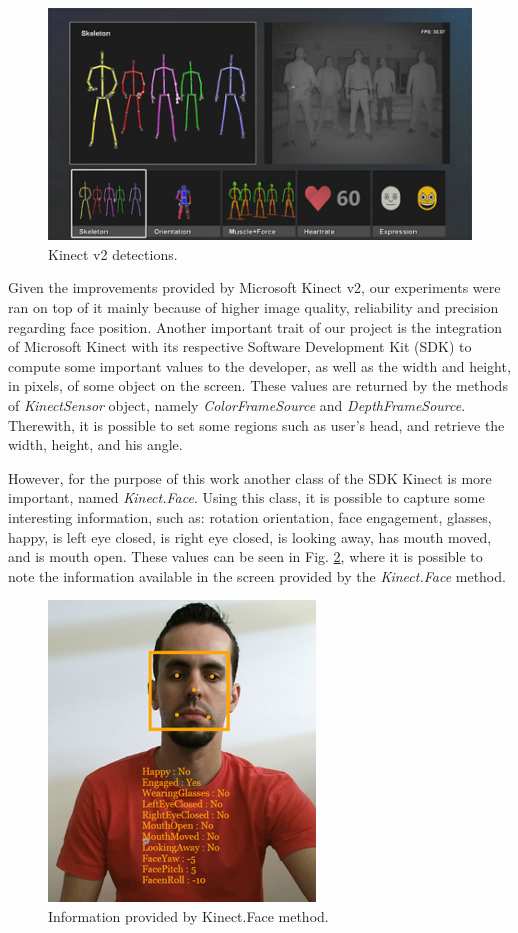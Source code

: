 \documentclass[10pt, conference]{IEEEtran}
\begin{document}
    \begin{figure}[t]
        \centering
        \includegraphics{figures/pic2.png}
        \caption{Kinect v2 detections.}
        \label{fig:fig2}
    \end{figure}

	Given the improvements provided by Microsoft Kinect v2, our experiments were ran on top of it mainly because of higher image quality, reliability and precision regarding face position.
	Another important trait of our project is the integration of Microsoft Kinect with its respective Software Development Kit (SDK) to compute some important values to the developer, as well as the width and height, in pixels, of some object on the screen.
    These values are returned by the methods of \emph{KinectSensor} object, namely \emph{ColorFrameSource} and \emph{DepthFrameSource}.
	Therewith, it is possible to set some regions such as user's head, and retrieve the width, height, and his angle.

	However, for the purpose of this work another class of the SDK Kinect is more important, named \emph{Kinect.Face}. 
	Using this class, it is possible to capture some interesting information, such as: rotation orientation, face engagement, glasses, happy, is left eye closed, is right eye closed, is looking away, has mouth moved, and is mouth open. 
	These values can be seen in Fig. \ref{fig:fig3}, where it is possible to note the information available in the screen provided by the \emph{Kinect.Face} method.

    \begin{figure}[t]
        \centering
        \includegraphics{figures/pic3.png}
        \caption{Information provided by Kinect.Face method.}
        \label{fig:fig3}
    \end{figure}
\end{document}
